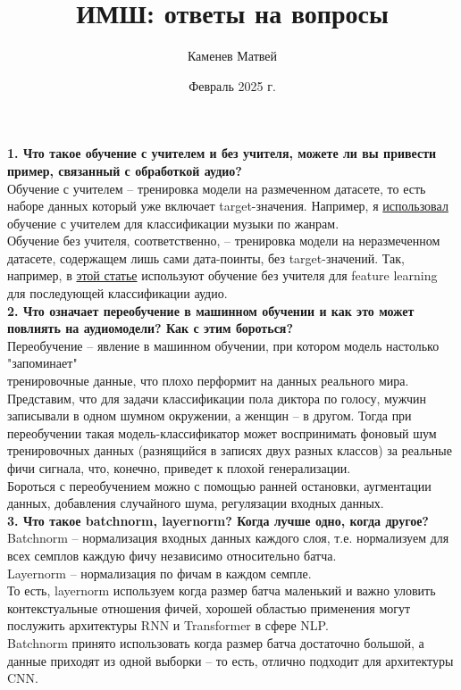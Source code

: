 \documentclass[12pt]{article}
\title{ИМШ: ответы на вопросы}
\author{Каменев Матвей}
\date{Февраль 2025 г.}
\begin{document}
\maketitle

\textbf{1. Что такое обучение с учителем и без учителя, можете ли вы привести пример, связанный с обработкой аудио?}\\
Обучение с учителем -- тренировка модели на размеченном датасете, то есть наборе данных который уже включает target-значения. Например, я \href{https://github.com/herbitovich/genre-classification}{использовал} обучение с учителем для классификации музыки по жанрам.\\
Обучение без учителя, соответственно, -- тренировка модели на неразмеченном датасете, содержащем лишь сами дата-поинты, без target-значений. Так, например, в \href{https://proceedings.neurips.cc/paper/2009/hash/a113c1ecd3cace2237256f4c712f61b5-Abstract.html}{этой статье} используют обучение без учителя для feature learning для последующей классификации аудио.\\

\textbf{2. Что означает переобучение в машинном обучении и как это может повлиять на аудиомодели? Как с этим бороться?}\\
Переобучение -- явление в машинном обучении, при котором модель настолько "запоминает"\\тренировочные данные, что плохо перформит на данных реального мира.\\
Представим, что для задачи классификации пола диктора по голосу, мужчин записывали в одном шумном окружении, а женщин -- в другом. Тогда при переобучении такая модель-классификатор может воспринимать фоновый шум тренировочных данных (разнящийся в записях двух разных классов) за реальные фичи сигнала, что, конечно, приведет к плохой генерализации.\\
Бороться с переобучением можно с помощью ранней остановки, аугментации данных, добавления случайного шума, регулязации входных данных.\\

\textbf{3. Что такое batchnorm, layernorm? Когда лучше одно, когда другое?}\\
Batchnorm -- нормализация входных данных каждого слоя, т.е. нормализуем для всех семплов каждую фичу независимо относительно батча.\\
Layernorm -- нормализация по фичам в каждом семпле.\\
То есть, layernorm используем когда размер батча маленький и важно уловить контекстуальные отношения фичей, хорошей областью применения могут послужить архитектуры RNN и Transformer в сфере NLP.\\
Batchnorm принято использовать когда размер батча достаточно большой, а данные приходят из одной выборки -- то есть, отлично подходит для архитектуры CNN.\\
\end{document}
